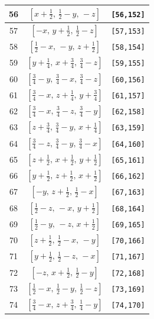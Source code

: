 \documentclass[fleqn,8pt]{jsarticle}
\begin{document}
\begin{longtable}{ccc}
56 & $\left[ x + \frac{1}{2},\, \frac{1}{2} - y,\, - z \right]$ & {\tt [56,152]} \\ \hline
57 & $\left[ - x,\, y + \frac{1}{2},\, \frac{1}{2} - z \right]$ & {\tt [57,153]} \\ \hline
58 & $\left[ \frac{1}{2} - x,\, - y,\, z + \frac{1}{2} \right]$ & {\tt [58,154]} \\ \hline
59 & $\left[ y + \frac{1}{4},\, x + \frac{3}{4},\, \frac{3}{4} - z \right]$ & {\tt [59,155]} \\ \hline
60 & $\left[ \frac{3}{4} - y,\, \frac{3}{4} - x,\, \frac{3}{4} - z \right]$ & {\tt [60,156]} \\ \hline
61 & $\left[ \frac{3}{4} - x,\, z + \frac{1}{4},\, y + \frac{3}{4} \right]$ & {\tt [61,157]} \\ \hline
62 & $\left[ \frac{3}{4} - x,\, \frac{3}{4} - z,\, \frac{3}{4} - y \right]$ & {\tt [62,158]} \\ \hline
63 & $\left[ z + \frac{3}{4},\, \frac{3}{4} - y,\, x + \frac{1}{4} \right]$ & {\tt [63,159]} \\ \hline
64 & $\left[ \frac{3}{4} - z,\, \frac{3}{4} - y,\, \frac{3}{4} - x \right]$ & {\tt [64,160]} \\ \hline
65 & $\left[ z + \frac{1}{2},\, x + \frac{1}{2},\, y + \frac{1}{2} \right]$ & {\tt [65,161]} \\ \hline
66 & $\left[ y + \frac{1}{2},\, z + \frac{1}{2},\, x + \frac{1}{2} \right]$ & {\tt [66,162]} \\ \hline
67 & $\left[ - y,\, z + \frac{1}{2},\, \frac{1}{2} - x \right]$ & {\tt [67,163]} \\ \hline
68 & $\left[ \frac{1}{2} - z,\, - x,\, y + \frac{1}{2} \right]$ & {\tt [68,164]} \\ \hline
69 & $\left[ \frac{1}{2} - y,\, - z,\, x + \frac{1}{2} \right]$ & {\tt [69,165]} \\ \hline
70 & $\left[ z + \frac{1}{2},\, \frac{1}{2} - x,\, - y \right]$ & {\tt [70,166]} \\ \hline
71 & $\left[ y + \frac{1}{2},\, \frac{1}{2} - z,\, - x \right]$ & {\tt [71,167]} \\ \hline
72 & $\left[ - z,\, x + \frac{1}{2},\, \frac{1}{2} - y \right]$ & {\tt [72,168]} \\ \hline
73 & $\left[ \frac{1}{2} - x,\, \frac{1}{2} - y,\, \frac{1}{2} - z \right]$ & {\tt [73,169]} \\ \hline
74 & $\left[ \frac{3}{4} - x,\, z + \frac{3}{4},\, \frac{1}{4} - y \right]$ & {\tt [74,170]} \\ \hline

\end{longtable}
\end{document}
